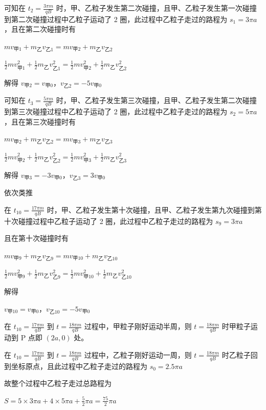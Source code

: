 \documentclass[\gkver]{gaokaozhenti}
\begin{document}
\begin{enumerate}
{可知在 $t_{2}=\frac{3\pi m}{qB}$ 时，甲、乙粒子发生第二次碰撞，且甲、乙粒子发生第一次碰撞到第二次碰撞过程中乙粒子运动了 2 圈，此过程中乙粒子走过的路程为 $s_{1}=3\pi a$，且在第二次碰撞时有

$mv_{\text{甲}1} + m_{\text{乙}}v_{\text{乙}1} = mv_{\text{甲}2} + m_{\text{乙}}v_{\text{乙}2}$

$\frac{1}{2}mv_{\text{甲}1}^{2} + \frac{1}{2}m_{\text{乙}}v_{\text{乙}1}^{2} = \frac{1}{2}mv_{\text{甲}2}^{2} + \frac{1}{2}m_{\text{乙}}v_{\text{乙}2}^{2}$

解得 $v_{\text{甲}2} = v_{\text{甲}0}$，$v_{\text{乙}2} = -5v_{\text{甲}0}$

可知在 $t_{3}=\frac{5\pi m}{qB}$ 时，甲、乙粒子发生第三次碰撞，且甲、乙粒子发生第二次碰撞到第三次碰撞过程中乙粒子运动了 2 圈，此过程中乙粒子走过的路程为 $s_{2}=5\pi a$，且在第三次碰撞时有

$mv_{\text{甲}2} + m_{\text{乙}}v_{\text{乙}2} = mv_{\text{甲}3} + m_{\text{乙}}v_{\text{乙}3}$

$\frac{1}{2}mv_{\text{甲}2}^{2} + \frac{1}{2}m_{\text{乙}}v_{\text{乙}2}^{2} = \frac{1}{2}mv_{\text{甲}3}^{2} + \frac{1}{2}m_{\text{乙}}v_{\text{乙}3}^{2}$

解得 $v_{\text{甲}3} = -3v_{\text{甲}0}$，$v_{\text{乙}3} = 3v_{\text{甲}0}$

依次类推

在 $t_{10}=\frac{17\pi m}{qB}$ 时，甲、乙粒子发生第十次碰撞，且甲、乙粒子发生第九次碰撞到第十次碰撞过程中乙粒子运动了 2 圈，此过程中乙粒子走过的路程为 $s_{9} = 3\pi a$

且在第十次碰撞时有

$mv_{\text{甲}9} + m_{\text{乙}}v_{\text{乙}9} = mv_{\text{甲}10} + m_{\text{乙}}v_{\text{乙}10}$

$\frac{1}{2}mv_{\text{甲}9}^{2} + \frac{1}{2}m_{\text{乙}}v_{\text{乙}9}^{2} = \frac{1}{2}mv_{\text{甲}10}^{2} + \frac{1}{2}m_{\text{乙}}v_{\text{乙}10}^{2}$

解得

$v_{\text{甲}10} = v_{\text{甲}0}$，$v_{\text{乙}10} = -5v_{\text{甲}0}$

在 $t_{10} = \frac{17\pi m}{qB}$ 到 $t = \frac{18\pi m}{qB}$ 过程中，甲粒子刚好运动半周，则 $t = \frac{18\pi m}{qB}$ 时甲粒子运动到 P 点即 $(2a,0)$ 处。

在 $t_{10} = \frac{17\pi m}{qB}$ 到 $t = \frac{18\pi m}{qB}$ 过程中，乙粒子刚好运动一周，则 $t = \frac{18\pi m}{qB}$ 时乙粒子回到坐标原点，且此过程中乙粒子走过的路程为 $s_{0} = 2.5\pi a$

故整个过程中乙粒子走过总路程为

$S = 5 \times 3\pi a + 4 \times 5\pi a + \frac{5}{2}\pi a = \frac{75}{2}\pi a$
}

\end{enumerate}
\end{document}

